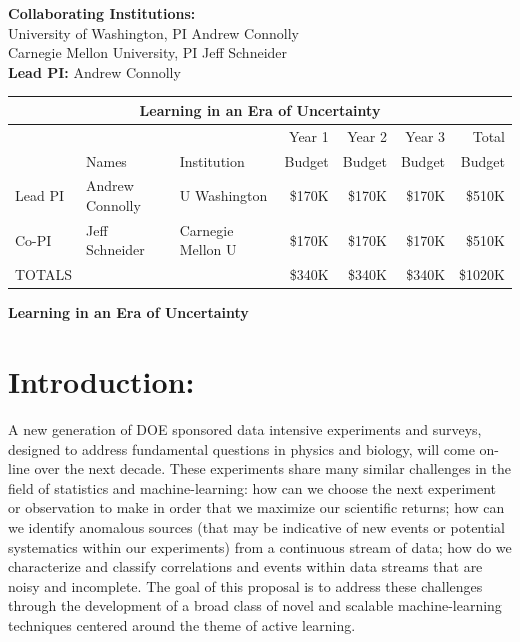 \documentclass[useAMS,usenatbib,tightenlines,11pt,preprint]{aastex}
\begin{document}
\newpage

{\bf Collaborating Institutions:} \\
University of Washington, PI Andrew Connolly \\
Carnegie Mellon University, PI Jeff Schneider \\

{\bf Lead PI:} Andrew Connolly \\

\noindent
\begin{tabular}{|l|l|l|r|r|r|r|}
\hline
\multicolumn{7}{|c|}{\bf Learning in an Era of Uncertainty} \\ \hline
&       &             & Year 1 & Year 2 & Year 3 & Total \\
& Names & Institution & Budget & Budget & Budget & Budget \\ \hline
Lead PI & Andrew Connolly & U Washington & \$170K & \$170K & \$170K & \$510K \\ \hline
Co-PI & Jeff Schneider & Carnegie Mellon U & \$170K & \$170K & \$170K & \$510K \\ \hline
{TOTALS} & & & \$340K & \$340K & \$340K & \$1020K \\ \hline
\end{tabular}


\newpage

\begin{center}
{\bf \Large Learning in an Era of Uncertainty}
\end{center}

\section{Introduction:}
A new generation of DOE sponsored data intensive experiments and
surveys, designed to address fundamental questions in physics and
biology, will come on-line over the next decade. These experiments
share many similar challenges in the field of statistics and
machine-learning: how can we choose the next experiment or observation
to make in order that we maximize our scientific returns; how can we
identify anomalous sources (that may be indicative of new events or
potential systematics within our experiments) from a continuous stream
of data; how do we characterize and classify correlations and events
within data streams that are noisy and incomplete. The goal of this
proposal is to address these challenges through the development of a broad
class of novel and scalable machine-learning techniques centered
around the theme of active learning.
\end{document}
